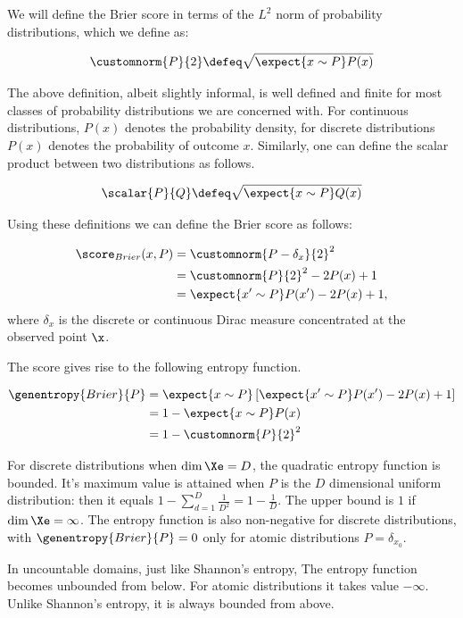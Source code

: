 We will define the Brier score in terms of the $L^2$ norm of probability distributions, which we define as:

\begin{equation}
	\customnorm{P}{2} \defeq \sqrt{\expect{x \sim P} P(x)}
\end{equation}

The above definition, albeit slightly informal, is well defined and finite for most classes of probability distributions we are concerned with. For continuous distributions, $P(x)$ denotes the probability density, for discrete distributions $P(x)$ denotes the probability of outcome $x$. Similarly, one can define the scalar product between two distributions as follows.

\begin{equation}
	\scalar{P}{Q} \defeq \sqrt{\expect{x \sim P} Q(x)}
\end{equation}

Using these definitions we can define the Brier score as follows:

\begin{align}
	\score_{Brier}(x,P) &= \customnorm{P - \delta_{x}}{2}^2\\
		&= \customnorm{P}{2}^{2} - 2P(x)  + 1\\
		&= \expect{x' \sim P} P(x') - 2P(x) + 1,
\end{align}
where $\delta_{x}$ is the discrete or continuous Dirac measure concentrated at the observed point $\x$.

The score gives rise to the following entropy function.

\begin{align}
	\genentropy{Brier}{P} &= \expect{x \sim P}\left[\expect{x' \sim P} P(x') - 2P(x) + 1\right]\\
		&= 1 -\expect{x \sim P} P(x)\\
		&= 1 - \customnorm{P}{2}^2
\end{align}

For discrete distributions when $\dim \Xe = D$, the quadratic entropy function is bounded. It's maximum value is attained when $P$ is the $D$ dimensional uniform distribution: then it equals $1 - \sum_{d=1}^{D}\frac{1}{D^2} = 1 - \frac{1}{D}$. The upper bound is $1$ if $\dim \Xe = \infty$. The entropy function is also non-negative for discrete distributions, with $\genentropy{Brier}{P}=0$ only for atomic distributions $P=\delta_{x_0}$.

In uncountable domains, just like Shannon's entropy, The entropy function becomes unbounded from below. For atomic distributions it takes value $-\infty$. Unlike Shannon's entropy, it is always bounded from above.

